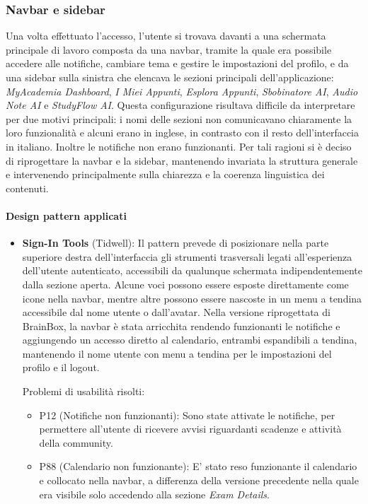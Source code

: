 \subsubsection{Navbar e sidebar}
Una volta effettuato l'accesso, l'utente si trovava davanti a una schermata principale di lavoro composta da una navbar, tramite la quale era possibile accedere alle notifiche, cambiare tema e gestire le impostazioni del profilo, e da una sidebar sulla sinistra che elencava le sezioni principali dell'applicazione: \textit{MyAcademia Dashboard}, \textit{I Miei Appunti}, \textit{Esplora Appunti}, \textit{Sbobinatore AI}, \textit{Audio Note AI} e \textit{StudyFlow AI}. Questa configurazione risultava difficile da interpretare per due motivi principali: i nomi delle sezioni non comunicavano chiaramente la loro funzionalità e alcuni erano in inglese, in contrasto con il resto dell'interfaccia in italiano. Inoltre le notifiche non erano funzionanti. Per tali ragioni si è deciso di riprogettare la navbar e la sidebar, mantenendo invariata la struttura generale e intervenendo principalmente sulla chiarezza e la coerenza linguistica dei contenuti.

\paragraph{Design pattern applicati}
\begin{itemize}
  \item \textbf{Sign-In Tools} (Tidwell): Il pattern prevede di posizionare nella parte superiore destra dell'interfaccia gli strumenti trasversali legati all'esperienza dell'utente autenticato, accessibili da qualunque schermata indipendentemente dalla sezione aperta. Alcune voci possono essere esposte direttamente come icone nella navbar, mentre altre possono essere nascoste in un menu a tendina accessibile dal nome utente o dall'avatar. Nella versione riprogettata di BrainBox, la navbar è stata arricchita rendendo funzionanti le notifiche e aggiungendo un accesso diretto al calendario, entrambi espandibili a tendina, mantenendo il nome utente con menu a tendina per le impostazioni del profilo e il logout.

    Problemi di usabilità risolti:
    \begin{itemize}
      \item P12 (Notifiche non funzionanti): Sono state attivate le notifiche, per permettere all'utente di ricevere avvisi riguardanti scadenze e attività della community.
      \item P88 (Calendario non funzionante): E' stato reso funzionante il calendario e collocato nella navbar, a differenza della versione precedente nella quale era visibile solo accedendo alla sezione \textit{Exam Details}.
    \end{itemize} 
\end{itemize}

